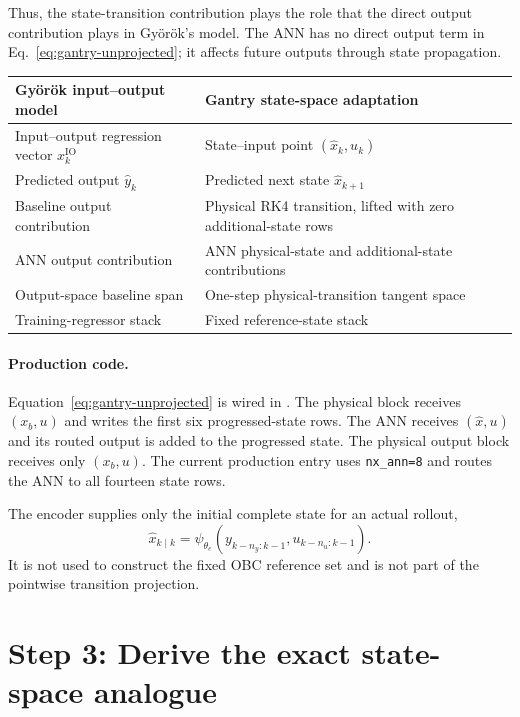 \documentclass[11pt,a4paper]{article}
\newcommand{\code}[1]{\texttt{#1}}
\begin{document}
Thus, the state-transition contribution plays the role that the direct output
contribution plays in Gy\"or\"ok's model.  The ANN has no direct output term in
Eq.~\eqref{eq:gantry-unprojected}; it affects future outputs through state
propagation.

\begin{center}
\begin{tabular}{L{0.39\textwidth}L{0.49\textwidth}}
\toprule
\textbf{Gy\"or\"ok input--output model} & \textbf{Gantry state-space adaptation}\\
\midrule
Input--output regression vector \(x_k^{\mathrm{IO}}\) & State--input point \((\widehat x_k,u_k)\)\\
Predicted output \(\widehat y_k\) & Predicted next state \(\widehat x_{k+1}\)\\
Baseline output contribution & Physical RK4 transition, lifted with zero additional-state rows\\
ANN output contribution & ANN physical-state and additional-state contributions\\
Output-space baseline span & One-step physical-transition tangent space\\
Training-regressor stack & Fixed reference-state stack\\
\bottomrule
\end{tabular}
\end{center}

\paragraph{Production code.}
Equation~\eqref{eq:gantry-unprojected} is wired in
.  The physical block receives
\((x_b,u)\) and writes the first six progressed-state rows.  The ANN receives
\((\widehat x,u)\) and its routed output is added to the progressed state.  The
physical output block receives only \((x_b,u)\).  The current production entry
uses \code{nx\_ann=8} and routes the ANN to all fourteen state rows.

The encoder supplies only the initial complete state for an actual rollout,
\begin{equation}
\widehat x_{k\mid k}
=\psi_{\theta_e}(y_{k-n_y:k-1},u_{k-n_u:k-1}).
\end{equation}
It is not used to construct the fixed OBC reference set and is not part of the
pointwise transition projection.

\clearpage
\section{Step 3: Derive the exact state-space analogue}
\end{document}
